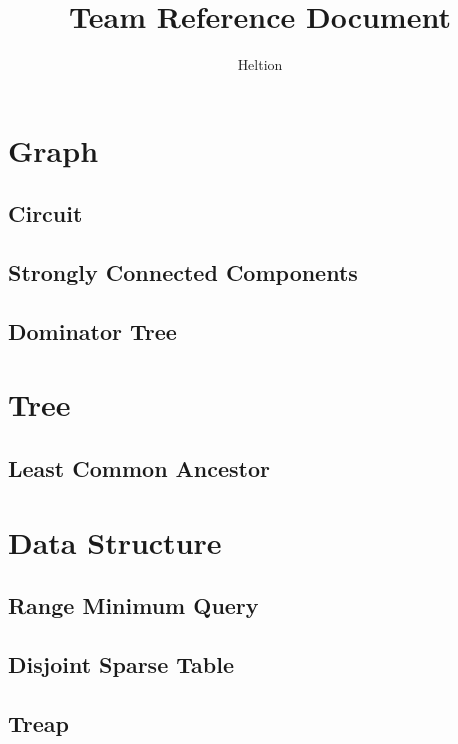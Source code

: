 \documentclass{article}
\begin{document}
\title{Team Reference Document}
\author{Heltion}
\maketitle
\newpage
\begin{multicols}{2}
    \tableofcontents
    \newpage

    \section{Graph}
    \subsection{Circuit}
    

    \subsection{Strongly Connected Components}
    

    \subsection{Dominator Tree}
    

    \section{Tree}
    \subsection{Least Common Ancestor}
    

    \section{Data Structure}
    \subsection{Range Minimum Query}
    
    \subsection{Disjoint Sparse Table}
    
    \subsection{Treap}
    

\end{multicols}
\end{document}

